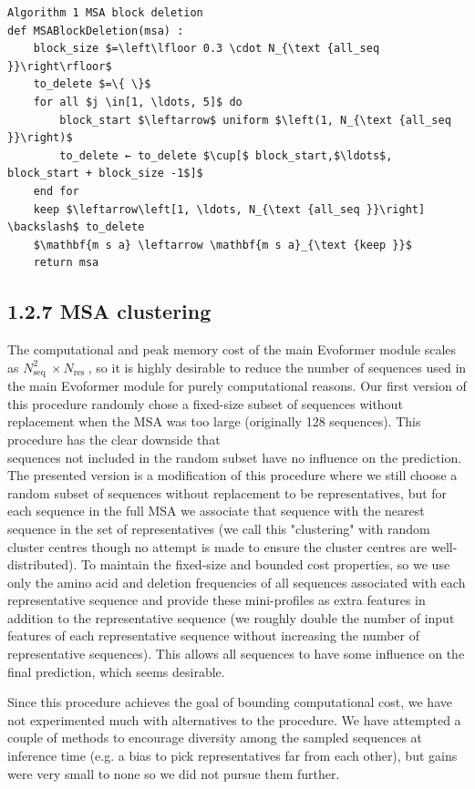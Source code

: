 \documentclass[10pt]{article}
\begin{document}
\begin{verbatim}
Algorithm 1 MSA block deletion
def MSABlockDeletion(msa) :
    block_size $=\left\lfloor 0.3 \cdot N_{\text {all_seq }}\right\rfloor$
    to_delete $=\{ \}$
    for all $j \in[1, \ldots, 5]$ do
        block_start $\leftarrow$ uniform $\left(1, N_{\text {all_seq }}\right)$
        to_delete ← to_delete $\cup[$ block_start,$\ldots$, block_start + block_size -1$]$
    end for
    keep $\leftarrow\left[1, \ldots, N_{\text {all_seq }}\right] \backslash$ to_delete
    $\mathbf{m s a} \leftarrow \mathbf{m s a}_{\text {keep }}$
    return msa
\end{verbatim}

\subsection*{1.2.7 MSA clustering}
The computational and peak memory cost of the main Evoformer module scales as $N_{\text {seq }}^{2} \times N_{\text {res }}$, so it is highly desirable to reduce the number of sequences used in the main Evoformer module for purely computational reasons. Our first version of this procedure randomly chose a fixed-size subset of sequences without replacement when the MSA was too large (originally 128 sequences). This procedure has the clear downside that\\
sequences not included in the random subset have no influence on the prediction. The presented version is a modification of this procedure where we still choose a random subset of sequences without replacement to be representatives, but for each sequence in the full MSA we associate that sequence with the nearest sequence in the set of representatives (we call this "clustering" with random cluster centres though no attempt is made to ensure the cluster centres are well-distributed). To maintain the fixed-size and bounded cost properties, so we use only the amino acid and deletion frequencies of all sequences associated with each representative sequence and provide these mini-profiles as extra features in addition to the representative sequence (we roughly double the number of input features of each representative sequence without increasing the number of representative sequences). This allows all sequences to have some influence on the final prediction, which seems desirable.

Since this procedure achieves the goal of bounding computational cost, we have not experimented much with alternatives to the procedure. We have attempted a couple of methods to encourage diversity among the sampled sequences at inference time (e.g. a bias to pick representatives far from each other), but gains were very small to none so we did not pursue them further.
\end{document}
